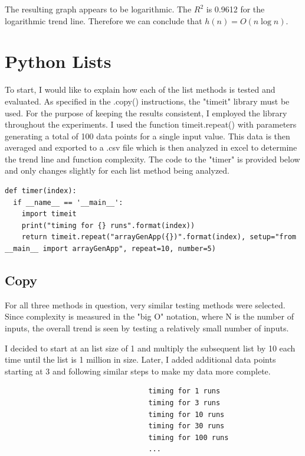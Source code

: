\documentclass[12pt]{article}
\begin{document}
\noindent The resulting graph appears to be logarithmic. The $R^2$ is 0.9612 for the logarithmic trend line. Therefore we can conclude that $h(n) = O(n\log{n})$.

\section{Python Lists}

To start, I would like to explain how each of the list methods is tested and evaluated. As specified in the .copy() instructions, the "timeit" library must be used. For the purpose of keeping the results consistent, I employed the library throughout the experiments. I used the function timeit.repeat() with parameters generating a total of 100 data points for a single input value. This data is then averaged and exported to a .csv file which is then analyzed in excel to determine the trend line and function complexity. The code to the "timer" is provided below and only changes slightly for each list method being analyzed.
\scriptsize
\begin{verbatim}
def timer(index):
  if __name__ == '__main__':
    import timeit
    print("timing for {} runs".format(index))
    return timeit.repeat("arrayGenApp({})".format(index), setup="from __main__ import arrayGenApp", repeat=10, number=5)
\end{verbatim}
\normalsize

\subsection{Copy}
For all three methods in question, very similar testing methods were selected. Since complexity is measured in the "big O" notation, where N is the number of inputs, the overall trend is seen by testing a relatively small number of inputs. 

I decided to start at an list size of 1 and multiply the subsequent list by 10 each time until the list is 1 million in size. Later, I  added additional data points starting at 3 and following similar steps to make my data more complete. 

\footnotesize
\begin{verbatim}
                                  timing for 1 runs
                                  timing for 3 runs
                                  timing for 10 runs
                                  timing for 30 runs
                                  timing for 100 runs
                                  ...
\end{verbatim}
\normalsize
  
\end{document}
